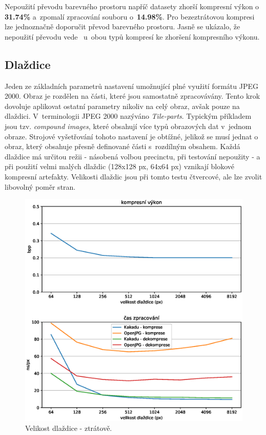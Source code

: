 \noindent Nepoužití převodu barevného prostoru napříč datasety zhorší kompresní výkon o \textbf{31.74\%} a~zpomalí zpracování souboru o~\textbf{14.98\%}. Pro bezeztrátovou kompresi lze jednoznačně doporučit převod barevného prostoru. Jasně se ukázalo, že nepoužití převodu vede ~u~obou typů kompresí ke zhoršení kompresního výkonu.

%
%
\newpage
\subsection*{Dlaždice}
Jeden ze základních parametrů nastavení umožnující plné využití formátu JPEG 2000. Obraz je rozdělen na části, které jsou samostatně zpracovávány. Tento krok dovoluje aplikovat ostatní parametry nikoliv na celý obraz, avšak pouze na dlaždici. V~terminologii JPEG 2000 nazýváno \textit{Tile-parts}. Typickým příkladem jsou tzv. \textit{compound images}, které obsahují více typů obrazových dat v~jednom obraze. Strojové vyšetřování tohoto nastavení je obtížné, jelikož se musí jednat o obraz, který obsahuje přesně definované části s~rozdílným obsahem.  Každá dlaždice má určitou režii - násobená volbou precinctu, při testování nepoužity - a při použití velmi malých dlaždic (128x128 px, 64x64 px) vznikají blokové kompresní artefakty. Velikosti dlaždic jsou při tomto testu čtvercové, ale lze zvolit libovolný poměr stran.

\begin{figure}[hbt!]
  \centering
  \hspace*{-0.75cm}
  \includegraphics[width=16cm]{obrazky-figures/tiles/fotky_tiles.eps}
  \caption{Velikost dlaždice - ztrátově.}
\end{figure}

